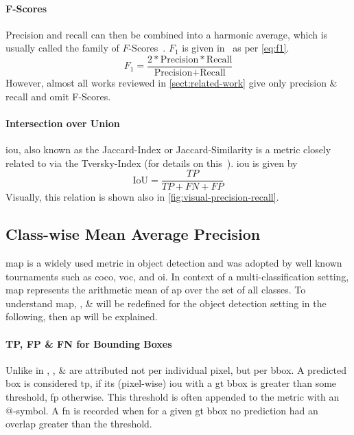 \paragraph{F-Scores}\label{par:f-scores}
Precision and recall can then be combined into a harmonic average, which is usually
called the family of \(F\)-Scores~\cite[e.g.][183]{Murphy.2012}. \(F_1\) is given
in~\cite[183]{Murphy.2012} as per \cref{eq:f1}.
\begin{equation}\label{eq:f1}
    F_1=\frac{2*\text{Precision}*\text{Recall}}{\text{Precision} + \text{Recall}}
\end{equation}
However, almost all works reviewed in \cref{sect:related-work} give only
precision \& recall and omit F-Scores.

\paragraph{Intersection over Union}\label{par:iou}
\Gls{iou}, also known as the Jaccard-Index or Jaccard-Similarity is a metric
closely related to  via the Tversky-Index (for details on
this~\cite[cf.][Section 6.3 Similarity Measures]{James.2011}). \Gls{iou} is 
given by
\begin{equation}
    \text{IoU}=\frac{TP}{TP + FN + FP}
\end{equation}
Visually, this relation is shown also in \cref{fig:visual-precision-recall}.

\subsection{Class-wise Mean Average Precision}\label{subsect:mAP}
\Acrfull{map} is a widely used metric in object detection and was adopted by
well known tournaments such as \gls{coco}, \gls{voc}, and \gls{oi}. In context
of a multi-classification setting, \gls{map} represents the arithmetic mean
of \gls{ap} over the set of all classes. To understand \gls{map}, ,
 \&  will be redefined for the object detection
setting in the following, then \gls{ap} will be explained.

\paragraph{TP, FP \& FN for Bounding Boxes}
Unlike in , , 
\&  are attributed not per individual pixel, but per \gls{bbox}.
A predicted box is considered \gls{tp}, if its (pixel-wise) \gls{iou} with a
\gls{gt} \gls{bbox} is greater than some threshold, \gls{fp} otherwise. This threshold
is often appended to the metric with an @-symbol.
A \gls{fn} is recorded when for a given \gls{gt} \gls{bbox} no prediction had an
overlap greater than the threshold.

